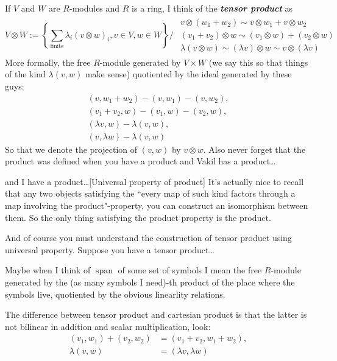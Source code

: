 \begin{defn}\leavevmode
If \(V\) and \(W\) are \(R\)-modules and \(R\) is a ring, I think of the \textit{\textbf{tensor product}} as
\[V\otimes W:=\left\{\sum_{\text{finite} }\lambda_i (v \otimes w)_i, v \in V, w \in W \right\} \Big/ \substack{\begin{array}{c}v \otimes (w_1+w_2)\sim v\otimes w_1+ v\otimes w_2\\ (v_1+v_2) \otimes w \sim(v_1 \otimes w)+(v_2 \otimes w)\\ \lambda(v \otimes w)\sim(\lambda v) \otimes w \sim  v \otimes(\lambda v)\end{array}}\]
More formally, the free \(R\)-module generated by \(V \times W\) (we say this so that things of the kind \(\lambda(v,w)\) make sense) quotiented by the ideal generated by these guys:
\begin{gather*}(v,w_1+w_2)-(v,w_1)-(v,w_2),\\ (v_1+v_2,w)-(v_1,w)-(v_2,w),\\ (\lambda v,w)-\lambda(v,w),\\(v,\lambda w)-\lambda(v,w)\end{gather*}
So that we denote the projection of \((v,w)\) by \(v \otimes w\). Also never forget that the product was defined when you have a product and Vakil has a product…
\begin{thing7}{and I have a product…}[Universal property of product]\leavevmode
It's actually nice to recall that any two objects satisfying the ``every map of such kind factors through a map involving the product"-property, you can construct an isomorphism between them. So the only thing satisfying the product property is the product.
\end{thing7}
\end{defn}
And of course you must understand the construction of tensor product using universal property. Suppose you have a tensor product…

\begin{remark}\leavevmode
Maybe when I think of \(\operatorname{span}\) of some set of symbols I mean the free \(R\)-module generated by the (as many symbols I need)-th product of the place where the symbols live, quotiented by the obvious linearlity relations.
\end{remark}

\begin{remark}\leavevmode
The difference between tensor product and cartesian product is that the latter is not bilinear in addition and scalar multiplication, look:
\begin{align*}
	(v_1,w_1)+(v_2,w_2)&=(v_1+v_2,w_1+w_2),\\
	\lambda(v,w)&=(\lambda v, \lambda w)
\end{align*}
\end{remark}

